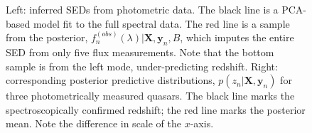 \documentclass{article}
\begin{document}
\begin{figure}[t]
\vskip -0.2in
\caption{Left: inferred SEDs from photometric data.  
The black line is a PCA-based model fit to the full spectral data.  
The red line is a sample from the posterior, $f^{(obs)}_n(\lambda) | \mathbf{X}, \mathbf{y}_n, B$, which imputes the entire SED from only five flux measurements.  
Note that the bottom sample is from the left mode, under-predicting redshift.   
Right: corresponding posterior predictive distributions, $p(z_n | \mathbf{X}, \mathbf{y}_n)$ for three photometrically measured quasars. 
The black line marks the spectroscopically confirmed redshift; the red line marks the posterior mean. Note the difference in scale of the $x$-axis.}
\label{fig:recon}
\vskip -0.1in
\end{figure}

\end{document}
